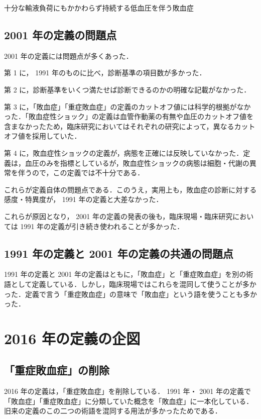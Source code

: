 \documentclass[10pt,uplatex]{jsarticle}
\begin{document}
十分な輸液負荷にもかかわらず持続する低血圧を伴う敗血症

\subsection{2001 年の定義の問題点}

2001 年の定義には問題点が多くあった．

第 1 に， 1991 年のものに比べ，診断基準の項目数が多かった．

第 2 に，診断基準をいくつ満たせば診断できるのかの明確な記載がなかった．

第 3 に，「敗血症」「重症敗血症」の定義のカットオフ値には科学的根拠がなかった．「敗血症性ショック」の定義は血管作動薬の有無や血圧のカットオフ値を含まなかったため，臨床研究においてはそれぞれの研究によって，異なるカットオフ値を採用していた．

第 4 に，敗血症性ショックの定義が，病態を正確には反映していなかった．定義は，血圧のみを指標としているが，敗血症性ショックの病態は細胞・代謝の異常を伴うので，この定義では不十分である．

これらが定義自体の問題点である．このうえ，実用上も，敗血症の診断に対する感度・特異度が， 1991 年の定義と大差なかった．

これらが原因となり， 2001 年の定義の発表の後も，臨床現場・臨床研究においては 1991 年の定義が引き続き使われることが多かった．

\subsection{1991 年の定義と 2001 年の定義の共通の問題点}

1991 年の定義と 2001 年の定義はともに，「敗血症」と「重症敗血症」を別の術語として定義している．しかし，臨床現場ではこれらを混同して使うことが多かった．定義で言う「重症敗血症」の意味で「敗血症」という語を使うことも多かった．

\section{2016 年の定義の企図}

\subsection{「重症敗血症」の削除}

2016 年の定義は，「重症敗血症」を削除している． 1991 年・ 2001 年の定義で「敗血症」「重症敗血症」に分類していた概念を「敗血症」に一本化している．旧来の定義のこの二つの術語を混同する用法が多かったためである．
\end{document}
